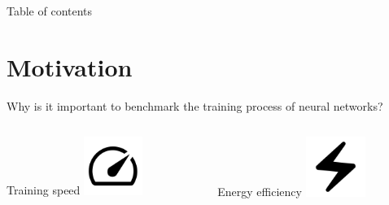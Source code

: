 \documentclass[compress,aspectratio=169]{beamer}
\title{\Large \mytitle}
\date{\mydate}
\subtitle{\mysubtitle}
\author{{\myauthor}}
\institute{\myinstitute}
\begin{document}
\begin{frame}[plain]
	\titlepage
\end{frame}

\begin{frame}[t]{Table of contents}
  \tableofcontents[subsectionstyle=hide/hide]
\end{frame}


\section{Motivation}

\begin{frame}{Why is it important to benchmark the training process of neural networks?}

    \begin{columns}
        \begin{column}{0.5\textwidth}
            \begin{block}{\centering Training speed}
                \centering
                \vspace{3em}
                \includegraphics[width=0.3\textwidth]{assets/speed_FILL0_wght400_GRAD0_opsz48.png}
            \end{block}
        \end{column}
        \begin{column}{0.5\textwidth}
            \begin{block}{\centering Energy efficiency}
                \centering
                \vspace{3em}
                \includegraphics[width=0.3\textwidth]{assets/electric_bolt_FILL0_wght400_GRAD0_opsz48}
            \end{block}
        \end{column}
    \end{columns}

\end{frame}
\end{document}
